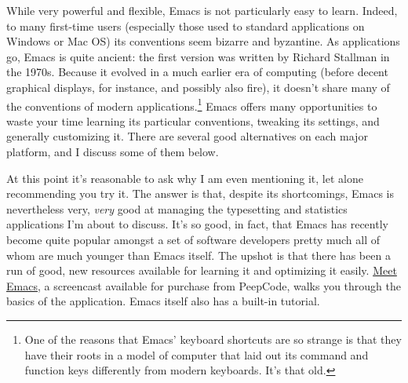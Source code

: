 \documentclass[11pt,article,oneside]{memoir}
\begin{document}
While very powerful and flexible, Emacs is not particularly easy to
learn. Indeed, to many first-time users (especially those used to
standard applications on Windows or Mac OS) its conventions seem
bizarre and byzantine. As applications go, Emacs is quite ancient: the
first version was written by Richard Stallman in the 1970s. Because it
evolved in a much earlier era of computing (before decent graphical
displays, for instance, and possibly also fire), it doesn't share many
of the conventions of modern applications.\footnote{One of the reasons that Emacs' keyboard shortcuts are so
strange is that they have their roots in a model of computer that laid
out its command and function keys differently from modern
keyboards. It's that old. } Emacs offers many
opportunities to waste your time learning its particular conventions,
tweaking its settings, and generally customizing it. There are several
good alternatives on each major platform, and I discuss some of them
below.

At this point it's reasonable to ask why I am even mentioning it, let
alone recommending you try it. The answer is that, despite its
shortcomings, Emacs is nevertheless very, \emph{very} good at managing
the typesetting and statistics applications I'm about to discuss. It's
so good, in fact, that Emacs has recently become quite popular amongst
a set of software developers pretty much all of whom are much younger
than Emacs itself. The upshot is that there has been a run of good,
new resources available for learning it and optimizing it
easily. \href{http://peepcode.com/products/meet-emacs}{Meet Emacs}, a
screencast available for purchase from PeepCode, walks you through the
basics of the application. Emacs itself also has a built-in tutorial.
\end{document}
